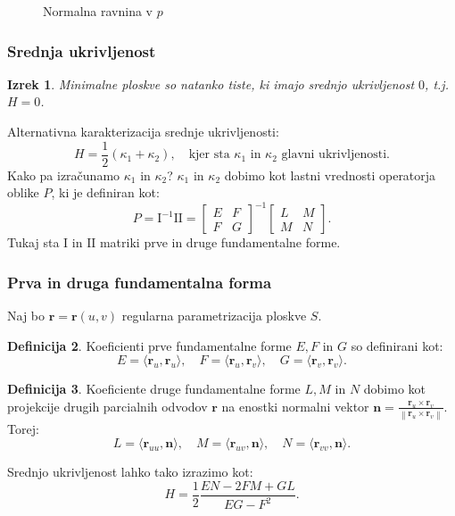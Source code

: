 \documentclass[10pt]{beamer}
\theoremstyle{definition}
\newtheorem{definicija}{Definicija}
\theoremstyle{remark}
\theoremstyle{plain}
\newtheorem{izrek}[definicija]{Izrek}
\numberwithin{equation}{section}  %
\begin{document}
\begin{frame}
\begin{figure}[H]
        \caption{Normalna ravnina v $p$}
        \label{fig:3}
    \end{figure}

\end{frame}

\begin{frame}
    \frametitle{Srednja ukrivljenost}

    \begin{izrek}
        Minimalne ploskve so natanko tiste, ki imajo srednjo ukrivljenost $0$, t.j. $H=0$. 
    \end{izrek}

    Alternativna karakterizacija srednje ukrivljenosti:
    $$
    H=\frac{1}{2}\left(\kappa_1+\kappa_2\right), \quad \text{kjer sta } \kappa_1 \text{ in } \kappa_2 \text{ glavni ukrivljenosti.} 
    $$
    Kako pa izračunamo $\kappa_1$ in $\kappa_2$? $\kappa_1$ in $\kappa_2$ dobimo kot lastni vrednosti operatorja oblike $P$, ki je definiran kot: 
    $$
    P=\mathrm{I}^{-1} \mathrm{II}=\begin{bmatrix} E & F \\ F & G \end{bmatrix}^{-1} \begin{bmatrix} L & M \\ M & N \end{bmatrix}.
    $$
    Tukaj sta $\mathrm{I}$ in $\mathrm{II}$ matriki prve in druge fundamentalne forme.

\end{frame}

\begin{frame}
    \frametitle{Prva in druga fundamentalna forma}

    Naj bo $\mathbf{r}=\mathbf{r}(u, v)$ regularna parametrizacija ploskve $S$. 

    \begin{definicija}
        Koeficienti prve fundamentalne forme $E, F$ in $G$ so definirani kot: 
        $$
        E=\langle\mathbf{r}_u, \mathbf{r}_u\rangle, \quad F=\langle\mathbf{r}_u, \mathbf{r}_v\rangle, \quad G=\langle\mathbf{r}_v, \mathbf{r}_v\rangle.
        $$
    \end{definicija}

    \begin{definicija}
        Koeficiente druge fundamentalne forme $L, M$ in $N$ dobimo kot projekcije drugih parcialnih odvodov $\mathbf{r}$ na enostki normalni vektor $\mathbf{n}=\frac{\mathbf{r}_u \times \mathbf{r}_v}{\left\|\mathbf{r}_u \times \mathbf{r}_v\right\|}$. Torej: 
        $$
        L=\langle \mathbf{r}_{u u}, \mathbf{n} \rangle, \quad M=\langle \mathbf{r}_{u v}, \mathbf{n}\rangle, \quad N= \langle \mathbf{r}_{v v}, \mathbf{n} \rangle.
        $$
    \end{definicija}

    Srednjo ukrivljenost lahko tako izrazimo kot: 
    $$
    H=\frac{1}{2} \frac{E N-2 F M+G L}{E G-F^2}.
    $$

\end{frame}
\end{document}

